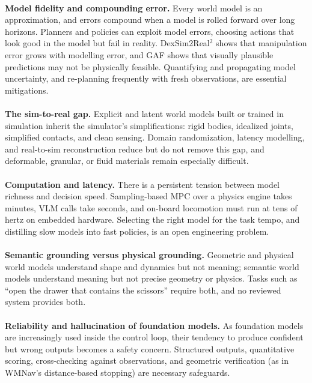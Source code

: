 \documentclass[12pt,a4paper,final]{extreport}
\begin{document}
\paragraph{} \textbf{Model fidelity and compounding error.} Every world model is an approximation, and errors compound when a model is rolled forward over long horizons. Planners and policies can exploit model errors, choosing actions that look good in the model but fail in reality. DexSim2Real$^2$ shows that manipulation error grows with modelling error, and GAF shows that visually plausible predictions may not be physically feasible. Quantifying and propagating model uncertainty, and re-planning frequently with fresh observations, are essential mitigations.

\paragraph{} \textbf{The sim-to-real gap.} Explicit and latent world models built or trained in simulation inherit the simulator's simplifications: rigid bodies, idealized joints, simplified contacts, and clean sensing. Domain randomization, latency modelling, and real-to-sim reconstruction reduce but do not remove this gap, and deformable, granular, or fluid materials remain especially difficult.

\paragraph{} \textbf{Computation and latency.} There is a persistent tension between model richness and decision speed. Sampling-based MPC over a physics engine takes minutes, VLM calls take seconds, and on-board locomotion must run at tens of hertz on embedded hardware. Selecting the right model for the task tempo, and distilling slow models into fast policies, is an open engineering problem.

\paragraph{} \textbf{Semantic grounding versus physical grounding.} Geometric and physical world models understand shape and dynamics but not meaning; semantic world models understand meaning but not precise geometry or physics. Tasks such as ``open the drawer that contains the scissors'' require both, and no reviewed system provides both.

\paragraph{} \textbf{Reliability and hallucination of foundation models.} As foundation models are increasingly used inside the control loop, their tendency to produce confident but wrong outputs becomes a safety concern. Structured outputs, quantitative scoring, cross-checking against observations, and geometric verification (as in WMNav's distance-based stopping) are necessary safeguards.
\end{document}
